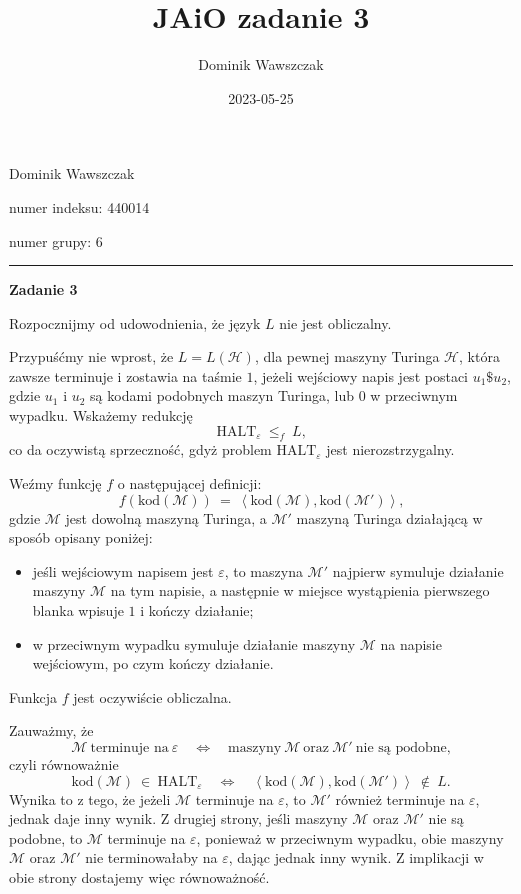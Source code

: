 \documentclass[12pt]{article}
\title{JAiO zadanie 3}
\author{Dominik Wawszczak}
\date{2023-05-25}
\begin{document}
	\setlength{\parindent}{0 cm}
	
	Dominik Wawszczak
	
	numer indeksu: 440014
	
	numer grupy: 6
	
	\bigskip
	\hrule
	\bigskip
	
	\textbf{Zadanie 3}
	
	\medskip
	
	Rozpocznijmy od udowodnienia, że język \(L\) nie jest obliczalny.
	
	\medskip
	
	Przypuśćmy nie wprost, że \(L = L \left( \mathcal{H} \right)\), dla pewnej
	maszyny Turinga \(\mathcal{H}\), która zawsze terminuje i zostawia na taśmie
	\(1\), jeżeli wejściowy napis jest postaci \(u_{1} \$ u_{2}\), gdzie
	\(u_{1}\) i \(u_{2}\) są kodami podobnych maszyn Turinga, lub \(0\) w
	przeciwnym wypadku. Wskażemy redukcję
	\[ \text{HALT}_{\varepsilon} \ \leqslant_{f} \ L \text{,} \]
	co da oczywistą sprzeczność, gdyż problem \(\text{HALT}_{\varepsilon}\) jest
	nierozstrzygalny.
	
	\medskip
	
	Weźmy funkcję \(f\) o następującej definicji:
	\[ f \left( \text{kod} \left( \mathcal{M} \right) \right) \ = \ \left\langle
	\text{kod} \left( \mathcal{M} \right), \text{kod} \left( \mathcal{M}'
	\right) \right\rangle \text{,} \]
	gdzie \(\mathcal{M}\) jest dowolną maszyną Turinga, a \(\mathcal{M}'\)
	maszyną Turinga działającą w sposób opisany poniżej:
	\begin{itemize}
		\item jeśli wejściowym napisem jest \(\varepsilon\), to maszyna
		      \(\mathcal{M}'\) najpierw symuluje działanie maszyny
		      \(\mathcal{M}\) na tym napisie, a następnie w miejsce wystąpienia
		      pierwszego blanka wpisuje \(1\) i kończy działanie;
		\item w przeciwnym wypadku symuluje działanie maszyny \(\mathcal{M}\) na
		      napisie wejściowym, po czym kończy działanie.
	\end{itemize}
	Funkcja \(f\) jest oczywiście obliczalna.
	
	\medskip
	
	Zauważmy, że
	\[ \mathcal{M} \ \text{terminuje na} \ \varepsilon \quad \iff \quad
	\text{maszyny} \ \mathcal{M} \ \text{oraz} \ \mathcal{M}' \ \text{nie są
	podobne,} \]
	czyli równoważnie
	\[ \text{kod} \left( \mathcal{M} \right) \ \in \ \text{HALT}_{\varepsilon}
	\quad \iff \quad \left\langle \text{kod} \left( \mathcal{M} \right),
	\text{kod} \left( \mathcal{M}' \right) \right\rangle \ \notin \ L
	\text{.} \]
	Wynika to z tego, że jeżeli \(\mathcal{M}\) terminuje na \(\varepsilon\),
	to \(\mathcal{M}'\) również terminuje na \(\varepsilon\), jednak daje inny
	wynik. Z drugiej strony, jeśli maszyny \(\mathcal{M}\) oraz \(\mathcal{M}'\)
	nie są podobne, to \(\mathcal{M}\) terminuje na \(\varepsilon\), ponieważ w
	przeciwnym wypadku, obie maszyny \(\mathcal{M}\) oraz \(\mathcal{M}'\) nie
	terminowałaby na \(\varepsilon\), dając jednak inny wynik. Z implikacji w
	obie strony dostajemy więc równoważność.
	
\end{document}
